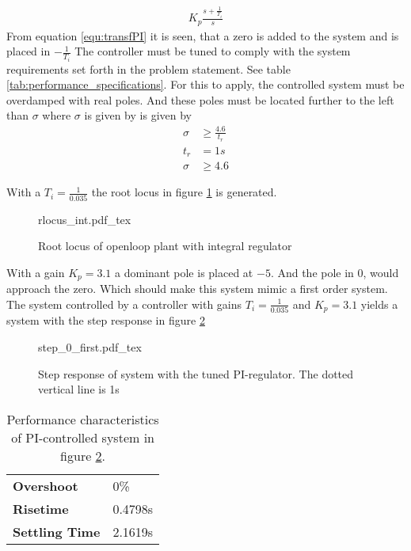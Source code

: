 \documentclass[../../../Main]{subfiles}
\begin{document}
\begin{align}
	K_p \frac{s+\frac{1}{T_i}}{s}
	\label{equ:transfPI}
\end{align}
From equation \eqref{equ:transfPI} it is seen, that a zero is added to the system and is placed in $-\frac{1}{T_i} $
The controller must be tuned to comply with the system requirements set forth in the problem statement. See table \ref{tab:performance_specifications}. For this to apply, the controlled system must be overdamped with real poles. And these poles must be located further to the left than $\sigma$ where $\sigma$ is given by is given by
\begin{align}
	\sigma &\ge \frac{4.6}{t_r}\\
    t_r &= 1 \si{s}\\
	\sigma &\ge 4.6
\end{align}

With a $T_i = \frac{1}{0.035}$ the root locus in figure \ref{fig:rlocus_int} is generated.

\begin{figure}[H]
\centering
\def\svgwidth{\textwidth}
{rlocus_int.pdf_tex}
\caption{Root locus of openloop plant with integral regulator}
\label{fig:rlocus_int}
\end{figure}

With a gain $K_p = 3.1$ a dominant pole is placed at $-5$. And the pole in 0, would approach the zero. Which should make this system mimic a first order system. The system controlled by a controller with gains $T_i = \frac{1}{0.035}$ and $K_p = 3.1$ yields a system with the step response in figure \ref{fig:step_0_first}

\begin{figure}[H]
\centering
\def\svgwidth{\textwidth}
{step_0_first.pdf_tex}
\caption{Step response of system with the tuned PI-regulator. The dotted vertical line is 1s}
\label{fig:step_0_first}
\end{figure}

\begin{table}[h]
	 \centering
	 \begin{tabular}{ll}
		\textbf{Overshoot} & 0\%\\
		 \textbf{Risetime} & 0.4798s\\
		 \textbf{Settling Time} & 2.1619s
	 \end{tabular}
	 \caption{Performance characteristics of PI-controlled system in figure \ref{fig:step_0_first}.}
	 \label{tab:performance_0_1}
\end{table}
\end{document}
